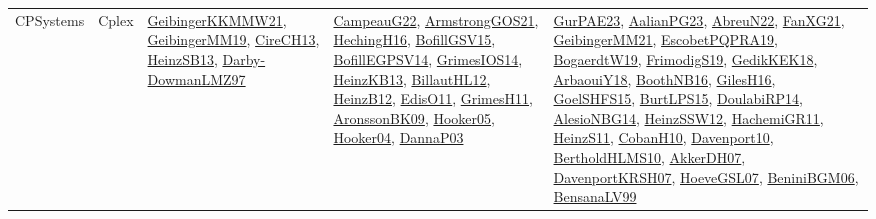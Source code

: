 {\begin{longtable}{lp{3cm}>{\raggedright}p{6cm}>{\raggedright}p{6cm}p{8cm}}
CPSystems & Cplex & \href{papers/GeibingerKKMMW21.pdf}{GeibingerKKMMW21}\cite{GeibingerKKMMW21}, \href{papers/GeibingerMM19.pdf}{GeibingerMM19}\cite{GeibingerMM19}, \href{papers/CireCH13.pdf}{CireCH13}\cite{CireCH13}, \href{articles/HeinzSB13.pdf}{HeinzSB13}\cite{HeinzSB13}, \href{articles/Darby-DowmanLMZ97.pdf}{Darby-DowmanLMZ97}\cite{Darby-DowmanLMZ97} & \href{articles/CampeauG22.pdf}{CampeauG22}\cite{CampeauG22}, \href{papers/ArmstrongGOS21.pdf}{ArmstrongGOS21}\cite{ArmstrongGOS21}, \href{papers/HechingH16.pdf}{HechingH16}\cite{HechingH16}, \href{papers/BofillGSV15.pdf}{BofillGSV15}\cite{BofillGSV15}, \href{papers/BofillEGPSV14.pdf}{BofillEGPSV14}\cite{BofillEGPSV14}, \href{articles/GrimesIOS14.pdf}{GrimesIOS14}\cite{GrimesIOS14}, \href{papers/HeinzKB13.pdf}{HeinzKB13}\cite{HeinzKB13}, \href{papers/BillautHL12.pdf}{BillautHL12}\cite{BillautHL12}, \href{papers/HeinzB12.pdf}{HeinzB12}\cite{HeinzB12}, \href{papers/EdisO11.pdf}{EdisO11}\cite{EdisO11}, \href{papers/GrimesH11.pdf}{GrimesH11}\cite{GrimesH11}, \href{papers/AronssonBK09.pdf}{AronssonBK09}\cite{AronssonBK09}, \href{articles/Hooker05.pdf}{Hooker05}\cite{Hooker05}, \href{papers/Hooker04.pdf}{Hooker04}\cite{Hooker04}, \href{papers/DannaP03.pdf}{DannaP03}\cite{DannaP03} & \href{articles/GurPAE23.pdf}{GurPAE23}\cite{GurPAE23}, \href{papers/AalianPG23.pdf}{AalianPG23}\cite{AalianPG23}, \href{articles/AbreuN22.pdf}{AbreuN22}\cite{AbreuN22}, \href{articles/FanXG21.pdf}{FanXG21}\cite{FanXG21}, \href{papers/GeibingerMM21.pdf}{GeibingerMM21}\cite{GeibingerMM21}, \href{articles/EscobetPQPRA19.pdf}{EscobetPQPRA19}\cite{EscobetPQPRA19}, \href{papers/BogaerdtW19.pdf}{BogaerdtW19}\cite{BogaerdtW19}, \href{papers/FrimodigS19.pdf}{FrimodigS19}\cite{FrimodigS19}, \href{articles/GedikKEK18.pdf}{GedikKEK18}\cite{GedikKEK18}, \href{papers/ArbaouiY18.pdf}{ArbaouiY18}\cite{ArbaouiY18}, \href{papers/BoothNB16.pdf}{BoothNB16}\cite{BoothNB16}, \href{papers/GilesH16.pdf}{GilesH16}\cite{GilesH16}, \href{articles/GoelSHFS15.pdf}{GoelSHFS15}\cite{GoelSHFS15}, \href{papers/BurtLPS15.pdf}{BurtLPS15}\cite{BurtLPS15}, \href{papers/DoulabiRP14.pdf}{DoulabiRP14}\cite{DoulabiRP14}, \href{papers/AlesioNBG14.pdf}{AlesioNBG14}\cite{AlesioNBG14}, \href{articles/HeinzSSW12.pdf}{HeinzSSW12}\cite{HeinzSSW12}, \href{articles/HachemiGR11.pdf}{HachemiGR11}\cite{HachemiGR11}, \href{papers/HeinzS11.pdf}{HeinzS11}\cite{HeinzS11}, \href{papers/CobanH10.pdf}{CobanH10}\cite{CobanH10}, \href{papers/Davenport10.pdf}{Davenport10}\cite{Davenport10}, \href{papers/BertholdHLMS10.pdf}{BertholdHLMS10}\cite{BertholdHLMS10}, \href{papers/AkkerDH07.pdf}{AkkerDH07}\cite{AkkerDH07}, \href{papers/DavenportKRSH07.pdf}{DavenportKRSH07}\cite{DavenportKRSH07}, \href{papers/HoeveGSL07.pdf}{HoeveGSL07}\cite{HoeveGSL07}, \href{papers/BeniniBGM06.pdf}{BeniniBGM06}\cite{BeniniBGM06}, \href{articles/BensanaLV99.pdf}{BensanaLV99}\cite{BensanaLV99}\\

\end{longtable}}
